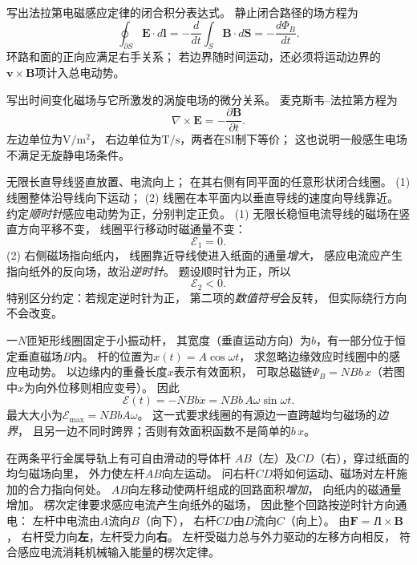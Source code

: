 \problemtext 写出法拉第电磁感应定律的闭合积分表达式。
\workings
静止闭合路径的场方程为
\[
\boxed{\oint_{\partial S}\bm E\cdot d\bm l
=-\frac d{dt}\int_S\bm B\cdot d\bm S
=-\frac{d\Phi_B}{dt}}.
\]
\crosscheck 环路和面的正向应满足右手关系；
若边界随时间运动，还必须将运动边界的
$\bm v\times\bm B$项计入总电动势。

\problemtext 写出时间变化磁场与它所激发的涡旋电场的微分关系。
\workings
麦克斯韦--法拉第方程为
\[
\boxed{\nabla\times\bm E=-\frac{\partial\bm B}{\partial t}}.
\]
\crosscheck 左边单位为$\mathrm{V/m^2}$，
右边单位为$\mathrm{T/s}$，两者在SI制下等价；
这也说明一般感生电场不满足无旋静电场条件。

\problemtext 无限长直导线竖直放置、电流向上；
在其右侧有同平面的任意形状闭合线圈。
(1) 线圈整体沿导线向下运动；
(2) 线圈在本平面内以垂直导线的速度向导线靠近。
约定\emph{顺时针}感应电动势为正，分别判定正负。
\workings
(1) 无限长稳恒电流导线的磁场在竖直方向平移不变，
线圈平行移动时磁通量不变：
\[
\boxed{\mathcal E_1=0}.
\]
(2) 右侧磁场指向纸内，
线圈靠近导线使进入纸面的通量\emph{增大}，
感应电流应产生指向纸外的反向场，故沿\emph{逆时针}。
题设顺时针为正，所以
\[
\boxed{\mathcal E_2<0}.
\]
\crosscheck 特别区分约定：若规定逆时针为正，
第二项的\emph{数值符号}会反转，
但实际绕行方向不会改变。

\problemtext 一$N$匝矩形线圈固定于小振动杆，
其宽度（垂直运动方向）为$b$，有一部分位于恒定垂直磁场$B$内。
杆的位置为$x(t)=A\cos\omega t$，
求忽略边缘效应时线圈中的感应电动势。
\workings
以边缘内的重叠长度$x$表示有效面积，
可取总磁链$\Psi_B=NBb\,x$（若图中$x$为向外位移则相应变号）。
因此
\[
\boxed{\mathcal E(t)=-NBb\dot x
=NBb\,A\omega\sin\omega t}.
\]
最大大小为$\boxed{\mathcal E_{\max}=NBbA\omega}$。
\crosscheck 这一式要求线圈的有源边一直跨越均匀磁场的\emph{边界}，
且另一边不同时跨界；否则有效面积函数不是简单的$b\,x$。

\problemtext 在两条平行金属导轨上有可自由滑动的导体杆
$AB$（左）及$CD$（右），穿过纸面的均匀磁场向里，
外力使左杆$AB$向左运动。
问右杆$CD$将如何运动、磁场对左杆施加的合力指向何处。
\workings
$AB$向左移动使两杆组成的回路面积\emph{增加}，
向纸内的磁通量增加。
楞次定律要求感应电流产生向纸外的磁场，
因此整个回路按逆时针方向通电：
左杆中电流由$A$流向$B$（向下），
右杆$CD$由$D$流向$C$（向上）。
由$\bm F=I\bm l\times\bm B$，
右杆受力向\textbf{左}，左杆受力向\textbf{右}。
\crosscheck 左杆受磁力总与外力驱动的左移方向相反，
符合感应电流消耗机械输入能量的楞次定律。


